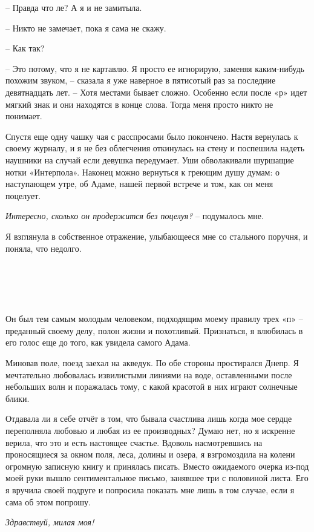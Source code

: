 \documentclass[
]{book}
\begin{document}
-- Правда что ле? А я и не замитыла.

-- Никто не замечает, пока я сама не скажу.

-- Как так?

-- Это потому, что я не картавлю. Я просто ее игнорирую, заменяя каким-нибудь похожим звуком, -- сказала я уже наверное в пятисотый раз за последние девятнадцать лет. -- Хотя местами бывает сложно. Особенно если после «р» идет мягкий знак и они находятся в конце слова. Тогда меня просто никто не понимает.

Спустя еще одну чашку чая с расспросами было покончено. Настя вернулась к своему журналу, и я не без облегчения откинулась на стену и поспешила надеть наушники на случай если девушка передумает. Уши обволакивали шуршащие нотки «Интерпола». Наконец можно вернуться к греющим душу думам: о наступающем утре, об Адаме, нашей первой встрече и том, как он меня поцелует.

\emph{Интересно, сколько он продержится без поцелуя?} -- подумалось мне.

Я взглянула в собственное отражение, улыбающееся мне со стального поручня, и поняла, что недолго.

\hypertarget{chapter-23}{%
\chapter{~}\label{chapter-23}}

Он был тем самым молодым человеком, подходящим моему правилу трех «п» -- преданный своему делу, полон жизни и похотливый. Признаться, я влюбилась в его голос еще до того, как увидела самого Адама.

Миновав поле, поезд заехал на акведук. По обе стороны простирался Днепр. Я мечтательно любовалась извилистыми линиями на воде, оставленными после небольших волн и поражалась тому, с какой красотой в них играют солнечные блики.

Отдавала ли я себе отчёт в том, что бывала счастлива лишь когда мое сердце переполняла любовью и любая из ее производных? Думаю нет, но я искренне верила, что это и есть настоящее счастье. Вдоволь насмотревшись на проносящиеся за окном поля, леса, долины и озера, я взгромоздила на колени огромную записную книгу и принялась писать. Вместо ожидаемого очерка из-под моей руки вышло сентиментальное письмо, занявшее три с половиной листа. Его я вручила своей подруге и попросила показать мне лишь в том случае, если я сама об этом попрошу.

\emph{Здравствуй, милая моя!}
\end{document}
